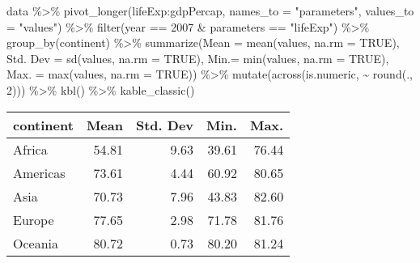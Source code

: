 \documentclass[
]{article}
\newenvironment{Shaded}{\begin{snugshade}}{\end{snugshade}}
\newcommand{\AttributeTok}[1]{\textcolor[rgb]{0.77,0.63,0.00}{#1}}
\newcommand{\ConstantTok}[1]{\textcolor[rgb]{0.00,0.00,0.00}{#1}}
\newcommand{\DecValTok}[1]{\textcolor[rgb]{0.00,0.00,0.81}{#1}}
\newcommand{\FunctionTok}[1]{\textcolor[rgb]{0.00,0.00,0.00}{#1}}
\newcommand{\NormalTok}[1]{#1}
\newcommand{\OtherTok}[1]{\textcolor[rgb]{0.56,0.35,0.01}{#1}}
\newcommand{\SpecialCharTok}[1]{\textcolor[rgb]{0.00,0.00,0.00}{#1}}
\newcommand{\StringTok}[1]{\textcolor[rgb]{0.31,0.60,0.02}{#1}}
\begin{document}
\begin{Shaded}
\begin{Highlighting}[]
\NormalTok{data }\SpecialCharTok{\%\textgreater{}\%}
  \FunctionTok{pivot\_longer}\NormalTok{(lifeExp}\SpecialCharTok{:}\NormalTok{gdpPercap, }\AttributeTok{names\_to =} \StringTok{"parameters"}\NormalTok{, }\AttributeTok{values\_to =} \StringTok{"values"}\NormalTok{) }\SpecialCharTok{\%\textgreater{}\%}
  \FunctionTok{filter}\NormalTok{(year }\SpecialCharTok{==} \DecValTok{2007} \SpecialCharTok{\&}\NormalTok{ parameters }\SpecialCharTok{==} \StringTok{"lifeExp"}\NormalTok{) }\SpecialCharTok{\%\textgreater{}\%}
  \FunctionTok{group\_by}\NormalTok{(continent) }\SpecialCharTok{\%\textgreater{}\%}
  \FunctionTok{summarize}\NormalTok{(}\AttributeTok{Mean =} \FunctionTok{mean}\NormalTok{(values, }\AttributeTok{na.rm =} \ConstantTok{TRUE}\NormalTok{),}
            \StringTok{\textasciigrave{}}\AttributeTok{Std. Dev}\StringTok{\textasciigrave{}} \OtherTok{=} \FunctionTok{sd}\NormalTok{(values, }\AttributeTok{na.rm =} \ConstantTok{TRUE}\NormalTok{),}
            \StringTok{\textasciigrave{}}\AttributeTok{Min.}\StringTok{\textasciigrave{}}\OtherTok{=} \FunctionTok{min}\NormalTok{(values, }\AttributeTok{na.rm =} \ConstantTok{TRUE}\NormalTok{),}
            \StringTok{\textasciigrave{}}\AttributeTok{Max.}\StringTok{\textasciigrave{}} \OtherTok{=} \FunctionTok{max}\NormalTok{(values, }\AttributeTok{na.rm =} \ConstantTok{TRUE}\NormalTok{)) }\SpecialCharTok{\%\textgreater{}\%}
  \FunctionTok{mutate}\NormalTok{(}\FunctionTok{across}\NormalTok{(is.numeric, }\SpecialCharTok{\textasciitilde{}} \FunctionTok{round}\NormalTok{(., }\DecValTok{2}\NormalTok{))) }\SpecialCharTok{\%\textgreater{}\%}
  \FunctionTok{kbl}\NormalTok{() }\SpecialCharTok{\%\textgreater{}\%}
  \FunctionTok{kable\_classic}\NormalTok{()}
\end{Highlighting}
\end{Shaded}

\begin{table}
\centering
\begin{tabular}[t]{l|r|r|r|r}
\hline
continent & Mean & Std. Dev & Min. & Max.\\
\hline
Africa & 54.81 & 9.63 & 39.61 & 76.44\\
\hline
Americas & 73.61 & 4.44 & 60.92 & 80.65\\
\hline
Asia & 70.73 & 7.96 & 43.83 & 82.60\\
\hline
Europe & 77.65 & 2.98 & 71.78 & 81.76\\
\hline
Oceania & 80.72 & 0.73 & 80.20 & 81.24\\
\hline
\end{tabular}
\end{table}
\end{document}
